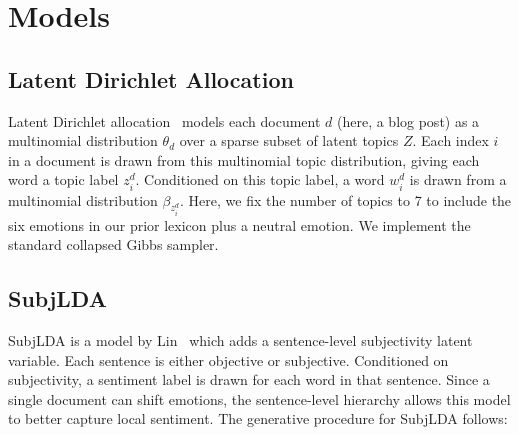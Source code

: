 \documentclass{article}
\begin{document}
\section{Models}
\subsection{Latent Dirichlet Allocation}
Latent Dirichlet allocation~\citep{blei03} models each document $d$
(here, a blog post) as a multinomial distribution $\theta_d$ over
a sparse subset of latent topics $Z$.  Each index $i$ in a document
is drawn from this multinomial topic distribution, giving each word
a topic label $z_i^d$. Conditioned on this topic label, a word
$w_i^d$ is drawn from a multinomial distribution $\beta_{z_i^d}$.
Here, we fix the number of topics to 7 to include the six emotions
in our prior lexicon plus a neutral emotion. We implement the
standard collapsed Gibbs sampler.

\subsection{SubjLDA} \label{sec:subjlda}
SubjLDA is a model by Lin~\citep{lin03} which adds a sentence-level
subjectivity latent variable. Each sentence is either objective or
subjective. Conditioned on subjectivity, a sentiment label is drawn
for each word in that sentence. Since a single document can shift
emotions, the sentence-level hierarchy allows this model to better
capture local sentiment. The generative procedure for SubjLDA
follows:
\end{document}
